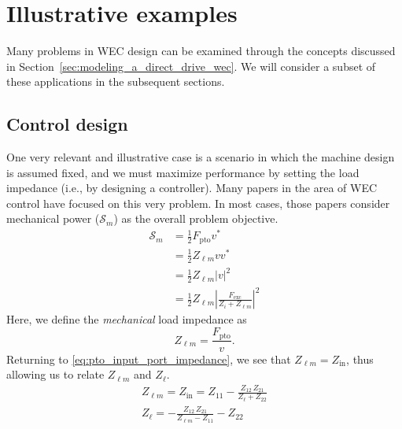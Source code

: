 \documentclass[lettersize,journal]{IEEEtran}
\begin{document}
\section{Illustrative examples}\label{sec:illustrative_examples}
Many problems in WEC design can be examined through the concepts discussed in Section~\ref{sec:modeling_a_direct_drive_wec}.
We will consider a subset of these applications in the subsequent sections.%

\subsection{Control design}\label{sec:control_design}
One very relevant and illustrative case is a scenario in which the machine design is assumed fixed, and we must maximize performance by setting the load impedance (i.e., by designing a controller).
Many papers in the area of WEC control have focused on this very problem.
In most cases, those papers consider mechanical power ($\mathcal{S}_{m}$) as the overall problem objective.
%
\begin{equation}
\begin{aligned}
        \mathcal{S}_{m} 
        &= \frac{1}{2} F_{\textrm{pto}} v^* \\
        &= \frac{1}{2}Z_{\ell m} v v^* \\
        &= \frac{1}{2}Z_{\ell m} | v |^2 \\
        &= \frac{1}{2} Z_{\ell m} \left| \frac{F_{\textrm{exc}}}{Z_i + Z_{\ell m}} \right|^2
\end{aligned}
\end{equation}
%
Here, we define the \emph{mechanical} load impedance as
%
\begin{equation}
        Z_{\ell m} = \frac{F_{\textrm{pto}}}{v} .
\end{equation}
%
Returning to \eqref{eq:pto_input_port_impedance}, we see that $Z_{\ell m}=Z_{\textrm{in}}$, thus allowing us to relate $Z_{\ell m}$ and $Z_{\ell}$.
%
\begin{subequations}
        \begin{gather}
                Z_{\ell m} = Z_{\textrm{in}} = Z_{11} - \frac{Z_{12} \, Z_{21}}{Z_\ell + Z_{22}} \\
                Z_\ell = - \frac{Z_{12} \,Z_{21} }{Z_{\ell m} - Z_{11}} - Z_{22}
        \end{gather}
        \label{eq:Zl_Zlm}
\end{subequations}
\end{document}

